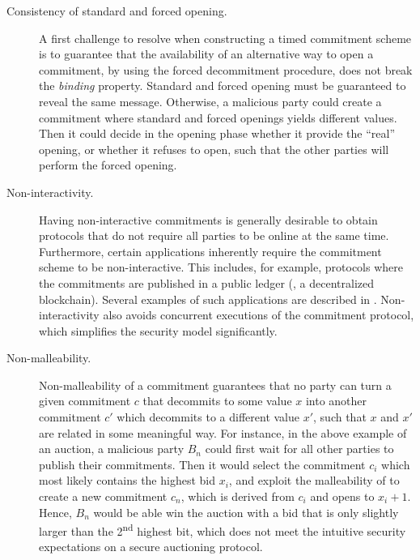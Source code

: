 \begin{description}
	\item[Consistency of standard and forced opening.] A first challenge to resolve when constructing a timed commitment scheme is to guarantee that the availability of an alternative way to open a commitment, by using the forced decommitment procedure, does not break the \emph{binding} property. Standard and forced opening must be guaranteed to reveal the same message. Otherwise, a malicious party could create a commitment where standard and forced openings yields different values. Then it could decide in the opening phase whether it provide the ``real'' opening, or whether it refuses to open, such that the other parties will perform the forced opening.
	
	\item[Non-interactivity.] Having non-interactive commitments is generally desirable to obtain protocols that do not require all parties to be online at the same time. Furthermore, certain applications inherently require the commitment scheme to be non-interactive. This includes, for example, protocols where the commitments are published in a public ledger (\eg, a decentralized blockchain). Several examples of such applications are described in \cite{C:MalThy19}. Non-interactivity also avoids concurrent executions of the commitment protocol, which simplifies the security model significantly.


	\item[Non-malleability.] 
	Non-malleability of a commitment guarantees that no party can turn a given commitment $c$ that decommits to some value $x$ into another commitment $c'$ which decommits to a different value $x'$, such that $x$ and $x'$ are related in some meaningful way.
	For instance, in the above example of an auction, a malicious party $B_n$ could first wait for all other parties to publish their commitments. Then it would select the commitment $c_i$ which most likely contains the highest bid $x_i$, and exploit the malleability of to create a new commitment $c_n$, which is derived from $c_i$ and opens to $x_i + 1$. Hence, $B_n$ would be able win the auction with a bid that is only slightly larger than the 2\textsuperscript{nd} highest bit, which does not meet the intuitive security expectations on a secure auctioning protocol.


\end{description}
